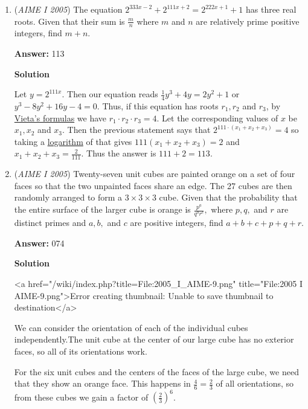 \begin{enumerate}
 $AB = AF + FB = 8 + 1 + \sqrt{141} = 9 + \sqrt{141}$ so the answer is $p+q=150$.

 -unhappyfarmer

 


	\item (\textit{AIME I 2005}) The equation $2^{333x-2} + 2^{111x+2} = 2^{222x+1} + 1$ has three real roots. Given that their sum is $\frac mn$ where $m$ and $n$ are relatively prime positive integers, find $m+n.$

 \textbf{Answer: }113



\textbf{Solution}

Let $y = 2^{111x}$.  Then our equation reads $\frac{1}{4}y^3 + 4y = 2y^2 + 1$ or $y^3 - 8y^2 + 16y - 4 = 0$.  Thus, if this equation has roots $r_1, r_2$ and $r_3$, by \href{https://artofproblemsolving.com/wiki/index.php?title=Vieta\%27s\_formulas}{Vieta's formulas} we have $r_1\cdot r_2\cdot r_3 = 4$.  Let the corresponding values of $x$ be $x_1, x_2$ and $x_3$.  Then the previous statement says that $2^{111\cdot(x_1 + x_2 + x_3)} = 4$ so taking a \href{https://artofproblemsolving.com/wiki/index.php?title=Logarithm}{logarithm} of that gives $111(x_1 + x_2 + x_3) = 2$ and $x_1 + x_2 + x_3 = \frac{2}{111}$.  Thus the answer is $111 + 2 = \boxed{113}$.

 


	\item (\textit{AIME I 2005}) Twenty-seven unit cubes are painted orange on a set of four faces so that the two unpainted faces share an edge. The 27 cubes are then randomly arranged to form a $3\times 3 \times 3$ cube. Given that the probability that the entire surface of the larger cube is orange is $\frac{p^a}{q^br^c},$ where $p,q,$ and $r$ are distinct primes and $a,b,$ and $c$ are positive integers, find $a+b+c+p+q+r.$

 \textbf{Answer: }074



\textbf{Solution}

<a href="/wiki/index.php?title=File:2005\_I\_AIME-9.png" title="File:2005 I AIME-9.png">Error creating thumbnail: Unable to save thumbnail to destination</a>

 We can consider the orientation of each of the individual cubes independently.The unit cube at the center of our large cube has no exterior faces, so all of its orientations work.

 For the six unit cubes and the centers of the faces of the large cube, we need that they show an orange face.  This happens in $\frac{4}{6} = \frac{2}{3}$ of all orientations, so from these cubes we gain a factor of $\left(\frac{2}{3}\right)^6$.


\end{enumerate}
